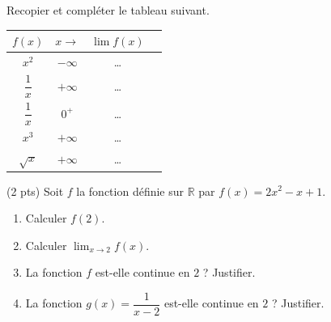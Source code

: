 \documentclass[11pt]{article}
\begin{document}
\begin{exercice}
Recopier et compléter le tableau suivant.
\begin{center}
\begin{tabular}{|c|c|c|c|}
\hline
$f(x)$ & $x \to$ & $\lim f(x)$ \\
\hline
$x^2$ & $-\infty$ & \ldots \\
\hline
$\dfrac{1}{x}$ & $+\infty$ & \ldots \\
\hline
$\dfrac{1}{x}$ & $0^+$ & \ldots \\
\hline
$x^3$ & $+\infty$ & \ldots \\
\hline
$\sqrt{x}$ & $+\infty$ & \ldots \\
\hline
\end{tabular}
\end{center}
\end{exercice}

\begin{exercice}[Continuité] (2 pts)
Soit $f$ la fonction définie sur $\mathbb{R}$ par $f(x) = 2x^2 - x + 1$.
\begin{enumerate}
\item Calculer $f(2)$.
\item Calculer $\displaystyle\lim_{x\to 2} f(x)$.
\item La fonction $f$ est-elle continue en $2$ ? Justifier.
\item La fonction $g(x) = \dfrac{1}{x-2}$ est-elle continue en $2$ ? Justifier.
\end{enumerate}
\end{exercice}
\end{document}
